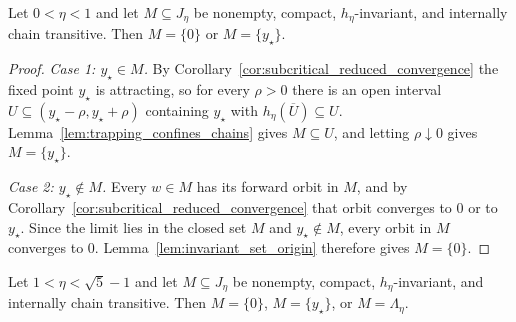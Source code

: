 \documentclass{article}
\begin{document}
\begin{theorem}
\label{thm:reduced_ict_classification_subcritical}
Let $0<\eta<1$ and let $M\subseteq J_\eta$ be nonempty, compact,
$h_\eta$-invariant, and internally chain transitive. Then
$M=\{0\}$ or $M=\{y_\star\}$.
\end{theorem}

\begin{proof}
\emph{Case 1: $y_\star\in M$.} By
Corollary~\ref{cor:subcritical_reduced_convergence} the fixed point $y_\star$ is
attracting, so for every $\rho>0$ there is an open interval
$U\subseteq(y_\star-\rho,y_\star+\rho)$ containing $y_\star$ with
$h_\eta(\overline U)\subseteq U$. Lemma~\ref{lem:trapping_confines_chains} gives
$M\subseteq U$, and letting $\rho\downarrow0$ gives $M=\{y_\star\}$.

\emph{Case 2: $y_\star\notin M$.} Every $w\in M$ has its forward orbit in $M$, and
by Corollary~\ref{cor:subcritical_reduced_convergence} that orbit converges to
$0$ or to $y_\star$. Since the limit lies in the closed set $M$ and
$y_\star\notin M$, every orbit in $M$ converges to $0$.
Lemma~\ref{lem:invariant_set_origin} therefore gives $M=\{0\}$.
\end{proof}

\begin{theorem}
\label{thm:reduced_ict_classification_postcritical}
Let $1<\eta<\sqrt5-1$ and let $M\subseteq J_\eta$ be nonempty, compact,
$h_\eta$-invariant, and internally chain transitive. Then
$M=\{0\}$, $M=\{y_\star\}$, or $M=\Lambda_\eta$.
\end{theorem}
\end{document}
